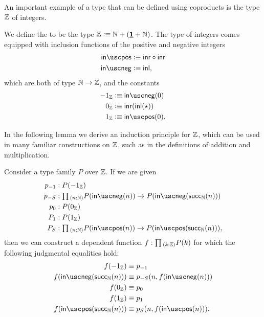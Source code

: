 An important example of a type that can be defined using coproducts is the type ${\mathbb{Z}}$ of integers.

\begin{defn}
  We define the  to be the type ${\mathbb{Z}}\vcentcolon\equiv{\mathbb{N}}+(\underline{\mathbf{1}}+{\mathbb{N}})$. The type of integers comes equipped with inclusion functions of the positive and negative integers
  \begin{align*}
    \inpos & \defeq \inr\circ\inr \\
    \inneg & \defeq \inl,
  \end{align*}
  which are both of type ${\mathbb{N}}\to{\mathbb{Z}}$, and the constants
  \begin{align*}
    -1_\Z & \defeq \inneg(0)\\
    0_\Z & \defeq \inr(\inl(\ttt))\\
    1_\Z & \defeq \inpos(0).
  \end{align*}
\end{defn}

In the following lemma we derive an induction principle for ${\mathbb{Z}}$, which can be used in many familiar constructions on ${\mathbb{Z}}$, such as in the definitions of addition and multiplication.

\begin{lem}\label{lem:Z_ind}
  Consider a type family $P$ over ${\mathbb{Z}}$. If we are given
  \begin{align*}
    p_{-1} & :P(-1_\Z) \\
    p_{-S} & : \prd{n:\N}P(\inneg(n))\to P(\inneg(\succN(n)))\\
    p_{0} & : P(0_\Z) \\
    P_{1} & : P(1_\Z) \\
    P_{S} & : \prd{n:\N}P(\inpos(n))\to P(\inpos(\succN(n))),
  \end{align*}
  then we can construct a dependent function $f:\prd{k:\Z}P(k)$ for which the following judgmental equalities hold:
  \begin{align*}
    f(-1_\Z) & \jdeq p_{-1} \\
    f(\inneg(\succN(n))) & \jdeq p_{-S}(n,f(\inneg(n))) \\
    f(0_\Z) & \jdeq p_{0} \\
    f(1_\Z) & \jdeq p_{1} \\
    f(\inpos(\succN(n))) & \jdeq p_S(n,f(\inpos(n))).
  \end{align*}
\end{lem}

